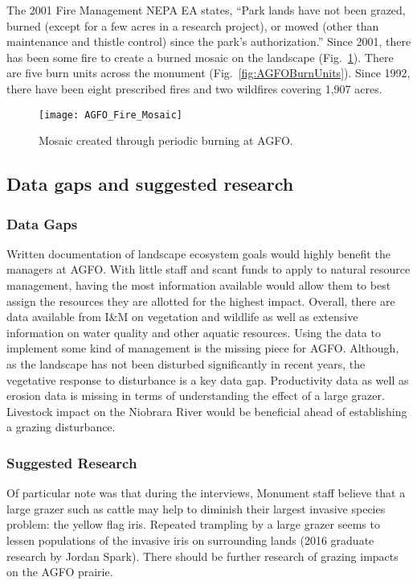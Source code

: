 The 2001 Fire Management NEPA EA states, ``Park lands have not been grazed, burned (except for a few acres in a research project), or mowed (other than maintenance and thistle control) since the park's authorization.'' 
Since 2001, there has been some fire to create a burned
mosaic on the landscape (Fig.~\ref{fig:AGFOFireMosaic}). 
There are five burn units across the monument (Fig.~\ref{fig:AGFOBurnUnits}). 
Since 1992, there have been eight prescribed fires and two wildfires covering 1,907 acres.

\begin{figure} 
	\centering
	\texttt{[image: AGFO\_Fire\_Mosaic]}
	\caption{Mosaic created through periodic burning at AGFO.} \label{fig:AGFOFireMosaic}
\end{figure}

\subsection{Data gaps and suggested research}

\subsubsection{Data Gaps}

Written documentation of landscape ecosystem goals would highly benefit the managers at AGFO. 
With little staff and scant funds to apply to natural resource management, having the most information available would allow them to best assign the resources they are allotted for the highest impact. 
Overall, there are data available from I\&M on vegetation and wildlife as well as extensive information on water quality and other aquatic resources. 
Using the data to implement some kind of management is the missing piece for AGFO. 
Although, as the landscape has not been disturbed significantly in recent years, the vegetative response to disturbance is a key data gap. 
Productivity data as well as erosion data is missing in terms of understanding the effect of a large grazer.
Livestock impact on the Niobrara River would be beneficial ahead of establishing a grazing disturbance.

\subsubsection{Suggested Research}

Of particular note was that during the interviews, Monument staff believe that a large grazer such as cattle may help to diminish their largest invasive species problem: the yellow flag iris. 
Repeated trampling by a large grazer seems to lessen populations of the invasive iris on surrounding lands (2016 graduate research by Jordan Spark). 
There should be further research of grazing impacts on the AGFO prairie.

